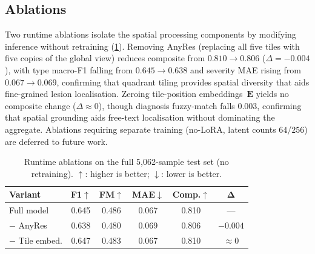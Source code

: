 \documentclass[runningheads]{llncs}
\begin{document}
\subsection{Ablations}
\label{sec:ablation}

Two runtime ablations isolate the spatial processing components by modifying
inference without retraining (\cref{tab:ablation}).
Removing AnyRes (replacing all five tiles with five copies of the global
view) reduces composite from $0.810 \to 0.806$ ($\Delta{=}{-}0.004$),
with type macro-F1 falling from $0.645 \to 0.638$ and severity MAE rising
from $0.067 \to 0.069$, confirming that quadrant tiling provides spatial
diversity that aids fine-grained lesion localisation.
Zeroing tile-position embeddings~$\mathbf{E}$ yields no composite change
($\Delta{\approx}0$), though diagnosis fuzzy-match falls $0.003$,
confirming that spatial grounding aids free-text localisation without dominating
the aggregate.
Ablations requiring separate training (no-LoRA, latent counts $64$/$256$)
are deferred to future work.

\begin{table}[t]
  \centering
  \caption{Runtime ablations on the full 5,062-sample test set (no retraining).
    $\uparrow$: higher is better; $\downarrow$: lower is better.}
  \label{tab:ablation}
  \setlength{\tabcolsep}{6pt}
  \begin{tabular}{@{}lccccc@{}}
    \toprule
    \textbf{Variant}
      & \textbf{F1}$\uparrow$
      & \textbf{FM}$\uparrow$
      & \textbf{MAE}$\downarrow$
      & \textbf{Comp.}$\uparrow$
      & $\boldsymbol{\Delta}$ \\
    \midrule
    Full model
      & 0.645 & 0.486 & 0.067 & 0.810 & \phantom{$-$}--- \\
    $-$ AnyRes
      & 0.638 & 0.480 & 0.069 & 0.806 & $-0.004$ \\
    $-$ Tile embed.
      & 0.647 & 0.483 & 0.067 & 0.810 & $\approx 0$ \\
    \bottomrule
  \end{tabular}
\end{table}
\end{document}
